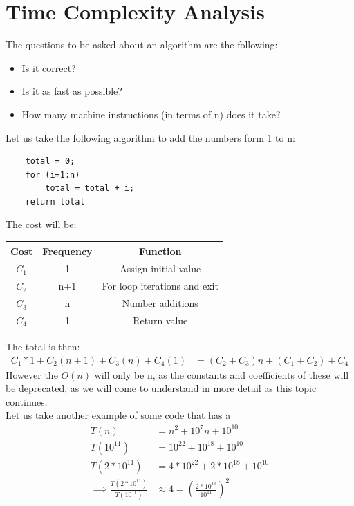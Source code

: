 \documentclass[nobib]{tufte-handout}
\begin{document}
\section{Time Complexity Analysis}
The questions to be asked about an algorithm are the following:
\begin{itemize}
    \item Is it correct?
    \item Is it as fast as possible?
    \item How many machine instructions (in terms of n) does it take?
\end{itemize}
Let us take the following algorithm to add the numbers form 1 to n:
\begin{lstlisting}
    total = 0;
    for (i=1:n)
        total = total + i;
    return total
\end{lstlisting}
The cost will be:\\
\begin{table}
    \centering
    \begin{tabular}{c|c|c}
        Cost  & Frequency & Function                     \\
        \hline
        $C_1$ & 1         & Assign initial value         \\
        $C_2$ & n+1       & For loop iterations and exit \\
        $C_3$ & n         & Number additions             \\
        $C_4$ & 1         & Return value                 \\
    \end{tabular}
\end{table}
\FloatBarrier
The total is then:\\
\begin{align*}
    C_1*1+C_2(n+1)+C_3(n)+C_4(1) & = (C_2+C_3)n+ (C_1+C_2)+C_4
\end{align*}
However the $O(n)$ will only be n, as the constants and coefficients of these will be deprecated, as we will come to understand in more detail as this topic continues.\\
Let us take another example of some code that has a
\begin{align*}
    T(n)                                     & = n^2 + 10^7n+10^{10}                                \\
    T(10^{11})                               & = 10^{22} + 10^{18}+ 10^{10}                         \\
    T(2*10^{11})                             & = 4*10^{22} + 2*10^{18}+ 10^{10}                     \\
    \implies \frac{T(2*10^{11})}{T(10^{11})} & \approx 4 = \left(\frac{2*10^{11}}{10^{11}}\right)^2
\end{align*}
\end{document}
